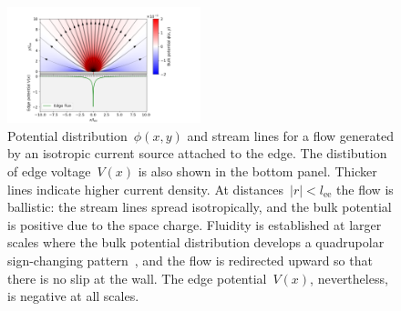 \documentclass[preprint,aps,eqsecnum, prb]{revtex4-1}
\newcommand{\inputpgf}[2]{{%
\let\pgfimageWithoutPath\pgfimage
\renewcommand{\pgfimage}[2][]{\pgfimageWithoutPath[##1]{#1/##2}}

}}
\begin{document}
\begin{figure}[h]
  \def\svgwidth{0.5\textwidth}
  \centering
  \includegraphics[width=0.5\textwidth, trim= 2in 0.2in 3in 0.5in]{combined-phi-h=0.png}
  \caption{
    \label{fig:edge-stream}
    \label{fig:edge-rho}
    Potential distribution~$\phi(x, y)$ and stream lines for  a flow
    generated by an isotropic current source attached to the edge.
    The distibution of edge voltage~$V(x)$ is also shown in the bottom
    panel. Thicker lines indicate higher current density. 
    At distances~$|r| < l_\mathrm{ee}$ the flow is ballistic: the stream lines
    spread isotropically, and the bulk potential is positive due to
    the space charge. Fluidity is established at larger scales where
    the bulk potential distribution develops a quadrupolar sign-changing
    pattern~\cite{bib:Levitov-Falkovich},
    and the flow is redirected upward so that there is no
    slip at the wall. The edge potential~$V(x)$, nevertheless, is
    negative at all scales. 
  }
\end{figure}
\end{document}
